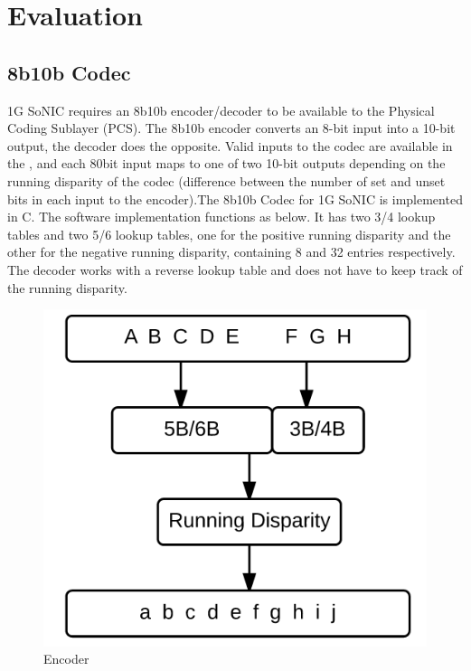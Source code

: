 \documentclass[conference]{IEEEtran}
\begin{document}
\section{Evaluation}

\subsection{8b10b Codec}

1G SoNIC requires an 8b10b encoder/decoder to be available to the Physical Coding Sublayer (PCS). The 8b10b encoder converts an 8-bit input into a 10-bit output, the decoder does the opposite. Valid inputs to the codec are available in the \cite{ieee8023}, and each 80bit input maps to one of two 10-bit outputs depending on the running disparity of the codec (difference between the number of set and unset bits in each input to the encoder).The 8b10b Codec for 1G SoNIC is implemented in C. The software implementation functions as below. It has two 3/4 lookup tables and two 5/6 lookup tables, one for the positive running disparity and the other for the negative running disparity, containing 8 and 32 entries respectively. The decoder works with a reverse lookup table and does not have to keep track of the running disparity.

\begin{figure}[h!]
  \centering
  \includegraphics[scale=0.50]{encoder}
  \caption{Encoder}
  \label{fig:encoder}
\end{figure}
\end{document}
